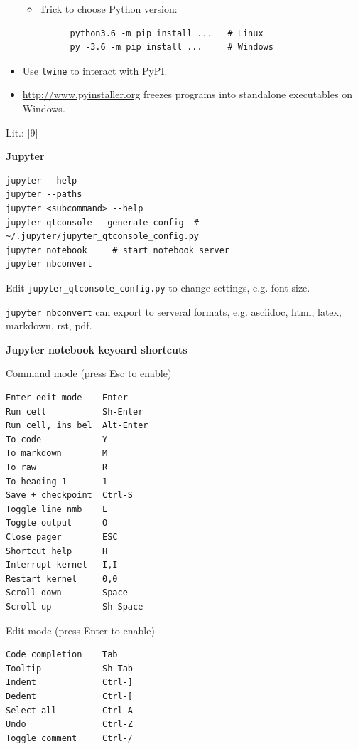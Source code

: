 \documentclass[9pt,a4wide]{extarticle}
\begin{document}
\begin{itemize}
\begin{itemize}
   \item Trick to choose Python version:
   
      \begin{verbatim}
      python3.6 -m pip install ...   # Linux
      py -3.6 -m pip install ...     # Windows
      \end{verbatim}

   \end{itemize}

   \item Use {\tt twine} to interact with PyPI.

   \item \url{http://www.pyinstaller.org} freezes programs into standalone
         executables on Windows.

\end{itemize}

Lit.: [9]



\medskip
{\bf Jupyter}

\begin{verbatim}
jupyter --help
jupyter --paths
jupyter <subcommand> --help
jupyter qtconsole --generate-config  # ~/.jupyter/jupyter_qtconsole_config.py
jupyter notebook     # start notebook server
jupyter nbconvert    
\end{verbatim}

Edit {\tt jupyter\_qtconsole\_config.py} to change settings, e.g. font size.

{\tt jupyter nbconvert} can export to serveral formats, e.g. asciidoc, html,
latex, markdown, rst, pdf.

\medskip

{\bf Jupyter notebook keyoard shortcuts}

Command mode (press Esc to enable)

\begin{verbatim}      
Enter edit mode    Enter
Run cell           Sh-Enter
Run cell, ins bel  Alt-Enter
To code            Y
To markdown        M
To raw             R
To heading 1       1
Save + checkpoint  Ctrl-S
Toggle line nmb    L
Toggle output      O
Close pager        ESC
Shortcut help      H
Interrupt kernel   I,I
Restart kernel     0,0
Scroll down        Space
Scroll up          Sh-Space
\end{verbatim}      

Edit mode (press Enter to enable)

\begin{verbatim}      
Code completion    Tab
Tooltip            Sh-Tab
Indent             Ctrl-]
Dedent             Ctrl-[
Select all         Ctrl-A
Undo               Ctrl-Z
Toggle comment     Ctrl-/
\end{verbatim}      
\end{document}

